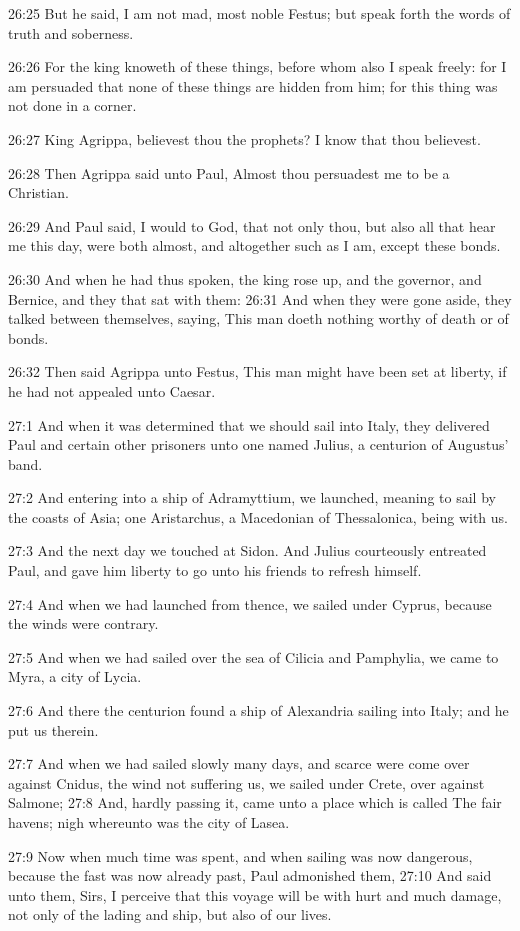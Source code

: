26:25 But he said, I am not mad, most noble Festus; but speak forth
the words of truth and soberness.

26:26 For the king knoweth of these things, before whom also I speak
freely: for I am persuaded that none of these things are hidden from
him; for this thing was not done in a corner.

26:27 King Agrippa, believest thou the prophets? I know that thou
believest.

26:28 Then Agrippa said unto Paul, Almost thou persuadest me to be a
Christian.

26:29 And Paul said, I would to God, that not only thou, but also all
that hear me this day, were both almost, and altogether such as I am,
except these bonds.

26:30 And when he had thus spoken, the king rose up, and the governor,
and Bernice, and they that sat with them: 26:31 And when they were
gone aside, they talked between themselves, saying, This man doeth
nothing worthy of death or of bonds.

26:32 Then said Agrippa unto Festus, This man might have been set at
liberty, if he had not appealed unto Caesar.

27:1 And when it was determined that we should sail into Italy, they
delivered Paul and certain other prisoners unto one named Julius, a
centurion of Augustus' band.

27:2 And entering into a ship of Adramyttium, we launched, meaning to
sail by the coasts of Asia; one Aristarchus, a Macedonian of
Thessalonica, being with us.

27:3 And the next day we touched at Sidon. And Julius courteously
entreated Paul, and gave him liberty to go unto his friends to refresh
himself.

27:4 And when we had launched from thence, we sailed under Cyprus,
because the winds were contrary.

27:5 And when we had sailed over the sea of Cilicia and Pamphylia, we
came to Myra, a city of Lycia.

27:6 And there the centurion found a ship of Alexandria sailing into
Italy; and he put us therein.

27:7 And when we had sailed slowly many days, and scarce were come
over against Cnidus, the wind not suffering us, we sailed under Crete,
over against Salmone; 27:8 And, hardly passing it, came unto a place
which is called The fair havens; nigh whereunto was the city of Lasea.

27:9 Now when much time was spent, and when sailing was now dangerous,
because the fast was now already past, Paul admonished them, 27:10 And
said unto them, Sirs, I perceive that this voyage will be with hurt
and much damage, not only of the lading and ship, but also of our
lives.

